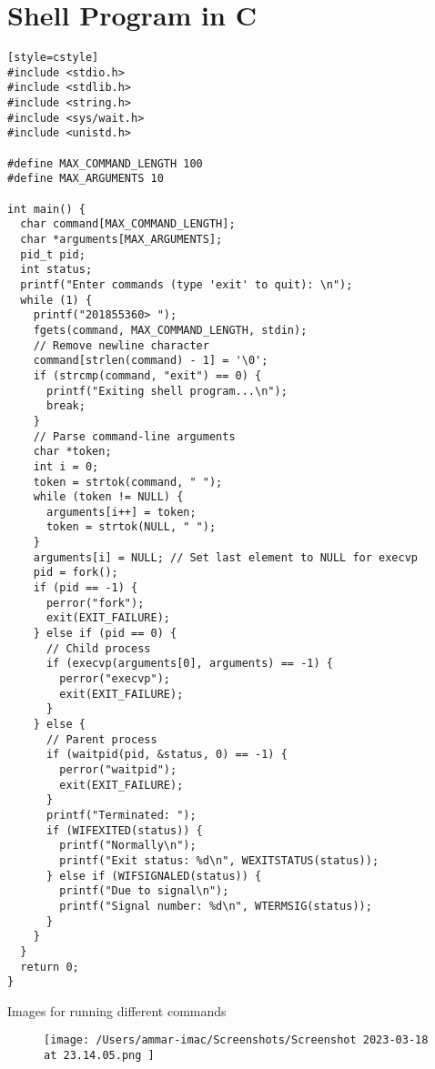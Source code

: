 \documentclass{article}
\begin{document}
\section{Shell Program in C}%
\begin{lstlisting}[style=cstyle][style=cstyle]
#include <stdio.h>
#include <stdlib.h>
#include <string.h>
#include <sys/wait.h>
#include <unistd.h>

#define MAX_COMMAND_LENGTH 100
#define MAX_ARGUMENTS 10

int main() {
  char command[MAX_COMMAND_LENGTH];
  char *arguments[MAX_ARGUMENTS];
  pid_t pid;
  int status;
  printf("Enter commands (type 'exit' to quit): \n");
  while (1) {
    printf("201855360> ");
    fgets(command, MAX_COMMAND_LENGTH, stdin);
    // Remove newline character
    command[strlen(command) - 1] = '\0';
    if (strcmp(command, "exit") == 0) {
      printf("Exiting shell program...\n");
      break;
    }
    // Parse command-line arguments
    char *token;
    int i = 0;
    token = strtok(command, " ");
    while (token != NULL) {
      arguments[i++] = token;
      token = strtok(NULL, " ");
    }
    arguments[i] = NULL; // Set last element to NULL for execvp
    pid = fork();
    if (pid == -1) {
      perror("fork");
      exit(EXIT_FAILURE);
    } else if (pid == 0) {
      // Child process
      if (execvp(arguments[0], arguments) == -1) {
        perror("execvp");
        exit(EXIT_FAILURE);
      }
    } else {
      // Parent process
      if (waitpid(pid, &status, 0) == -1) {
        perror("waitpid");
        exit(EXIT_FAILURE);
      }
      printf("Terminated: ");
      if (WIFEXITED(status)) {
        printf("Normally\n");
        printf("Exit status: %d\n", WEXITSTATUS(status));
      } else if (WIFSIGNALED(status)) {
        printf("Due to signal\n");
        printf("Signal number: %d\n", WTERMSIG(status));
      }
    }
  }
  return 0;
}
\end{lstlisting}

\newpage
Images for running different commands

\begin{figure}[ht]
	\centering
	\texttt{[image: /Users/ammar-imac/Screenshots/Screenshot 2023-03-18 at 23.14.05.png ]}
\end{figure}
\end{document}
